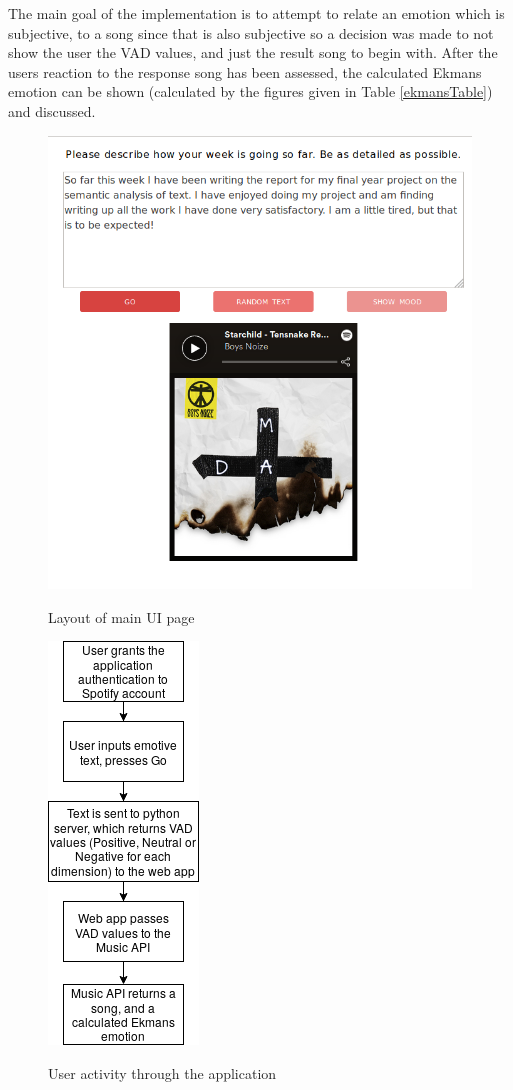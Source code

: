 The main goal of the implementation is to attempt to relate an emotion which is subjective, to a song since that is also subjective so a decision was made to not show the user the VAD values, and just the result song to begin with. After the users reaction to the response song has been assessed, the calculated Ekmans emotion can be shown (calculated by the figures given in Table \ref{ekmansTable}) and discussed.

\begin{figure}[ht]
\caption{Layout of main UI page}
\centering
\includegraphics[scale=0.4]{litImgs/UIScreenshot.png}
\label{UIlayout}
\end{figure}

\begin{figure}[ht]
\caption{User activity through the application}
\centering
\includegraphics[scale=0.6]{litImgs/interfaceFlow.png}
\label{implementationLayout}
\end{figure}